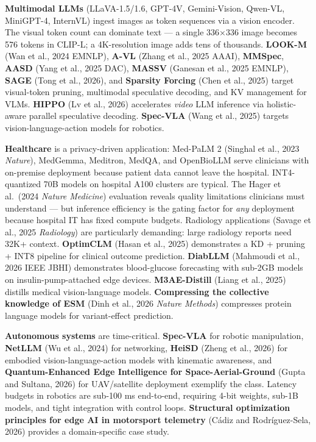 \textbf{Multimodal LLMs} (LLaVA-1.5/1.6, GPT-4V, Gemini-Vision, Qwen-VL, MiniGPT-4, InternVL) ingest images as token sequences via a vision encoder. The visual token count can dominate text --- a single 336×336 image becomes 576 tokens in CLIP-L; a 4K-resolution image adds tens of thousands. \textbf{LOOK-M} (Wan et al., 2024 EMNLP), \textbf{A-VL} (Zhang et al., 2025 AAAI), \textbf{MMSpec}, \textbf{AASD} (Yang et al., 2025 DAC), \textbf{MASSV} (Ganesan et al., 2025 EMNLP), \textbf{SAGE} (Tong et al., 2026), and \textbf{Sparsity Forcing} (Chen et al., 2025) target visual-token pruning, multimodal speculative decoding, and KV management for VLMs. \textbf{HIPPO} (Lv et al., 2026) accelerates \emph{video} LLM inference via holistic-aware parallel speculative decoding. \textbf{Spec-VLA} (Wang et al., 2025) targets vision-language-action models for robotics.

\textbf{Healthcare} is a privacy-driven application: Med-PaLM 2 (Singhal et al., 2023 \emph{Nature}), MedGemma, Meditron, MedQA, and OpenBioLLM serve clinicians with on-premise deployment because patient data cannot leave the hospital. INT4-quantized 70B models on hospital A100 clusters are typical. The Hager et al.~(2024 \emph{Nature Medicine}) evaluation reveals quality limitations clinicians must understand --- but inference efficiency is the gating factor for \emph{any} deployment because hospital IT has fixed compute budgets. Radiology applications (Savage et al., 2025 \emph{Radiology}) are particularly demanding: large radiology reports need 32K+ context. \textbf{OptimCLM} (Hasan et al., 2025) demonstrates a KD + pruning + INT8 pipeline for clinical outcome prediction. \textbf{DiabLLM} (Mahmoudi et al., 2026 IEEE JBHI) demonstrates blood-glucose forecasting with sub-2GB models on insulin-pump-attached edge devices. \textbf{M3AE-Distill} (Liang et al., 2025) distills medical vision-language models. \textbf{Compressing the collective knowledge of ESM} (Dinh et al., 2026 \emph{Nature Methods}) compresses protein language models for variant-effect prediction.

\textbf{Autonomous systems} are time-critical. \textbf{Spec-VLA} for robotic manipulation, \textbf{NetLLM} (Wu et al., 2024) for networking, \textbf{HeiSD} (Zheng et al., 2026) for embodied vision-language-action models with kinematic awareness, and \textbf{Quantum-Enhanced Edge Intelligence for Space-Aerial-Ground} (Gupta and Sultana, 2026) for UAV/satellite deployment exemplify the class. Latency budgets in robotics are sub-100 ms end-to-end, requiring 4-bit weights, sub-1B models, and tight integration with control loops. \textbf{Structural optimization principles for edge AI in motorsport telemetry} (Cádiz and Rodríguez-Sela, 2026) provides a domain-specific case study.


